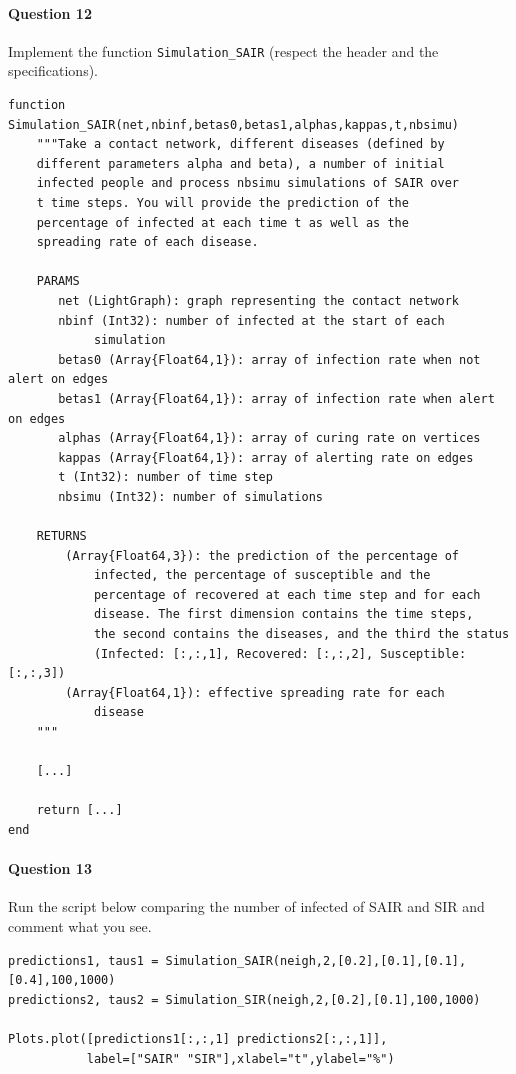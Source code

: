 \documentclass{article}
\begin{document}
\paragraph{Question 12} Implement the function \texttt{Simulation\_SAIR} (respect the header and the specifications).

\begin{verbatim}
function Simulation_SAIR(net,nbinf,betas0,betas1,alphas,kappas,t,nbsimu)
    """Take a contact network, different diseases (defined by 
    different parameters alpha and beta), a number of initial
    infected people and process nbsimu simulations of SAIR over
    t time steps. You will provide the prediction of the 
    percentage of infected at each time t as well as the 
    spreading rate of each disease.
    
    PARAMS
       net (LightGraph): graph representing the contact network
       nbinf (Int32): number of infected at the start of each 
            simulation
       betas0 (Array{Float64,1}): array of infection rate when not alert on edges
       betas1 (Array{Float64,1}): array of infection rate when alert on edges
       alphas (Array{Float64,1}): array of curing rate on vertices
       kappas (Array{Float64,1}): array of alerting rate on edges
       t (Int32): number of time step
       nbsimu (Int32): number of simulations
    
    RETURNS
        (Array{Float64,3}): the prediction of the percentage of 
            infected, the percentage of susceptible and the 
            percentage of recovered at each time step and for each 
            disease. The first dimension contains the time steps,
            the second contains the diseases, and the third the status
            (Infected: [:,:,1], Recovered: [:,:,2], Susceptible: [:,:,3])
        (Array{Float64,1}): effective spreading rate for each 
            disease
    """

    [...]

    return [...]
end
\end{verbatim}

\paragraph{Question 13} Run the script below comparing the number of infected of SAIR and SIR and comment what you see.

\begin{verbatim}
predictions1, taus1 = Simulation_SAIR(neigh,2,[0.2],[0.1],[0.1],[0.4],100,1000)
predictions2, taus2 = Simulation_SIR(neigh,2,[0.2],[0.1],100,1000)

Plots.plot([predictions1[:,:,1] predictions2[:,:,1]],
           label=["SAIR" "SIR"],xlabel="t",ylabel="%")
\end{verbatim}
\end{document}
